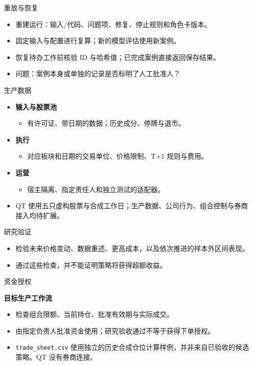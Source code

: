 \begin{frame}{重放与恢复\handsup}
\begin{itemize}
\item 重建运行：输入/代码、问题项、修复、停止规则和角色卡版本。
\item 固定输入与配置进行复算；新的模型评估使用新案例。
\item 恢复待办工作前核验 ID 与哈希值；已完成案例直接返回保存结果。
\item 问题：案例本身或单独的记录是否标明了人工批准人？
\end{itemize}
\end{frame}

\begin{frame}{生产数据}
\begin{itemize}
\item \textbf{输入与股票池}
\begin{itemize}
\item 有许可证、带日期的数据；历史成分、停牌与退市。
\end{itemize}
\item \textbf{执行}
\begin{itemize}
\item 对应板块和日期的交易单位、价格限制、T+1 规则与费用。
\end{itemize}
\item \textbf{运营}
\begin{itemize}
\item 宿主隔离、指定责任人和独立测试的适配器。
\end{itemize}
\item QT 使用五只虚构股票与合成工作日；生产数据、公司行为、组合控制与券商接入均待扩展。
\end{itemize}
\end{frame}

\begin{frame}{研究验证}
\begin{center}
\resizebox{.94\textwidth}{!}{}
\end{center}
\begin{itemize}
\item 检验未来价格变动、数据重述、更高成本，以及依次推进的样本外区间表现。
\item 通过这些检查，并不能证明策略将获得超额收益。
\end{itemize}
\end{frame}

\begin{frame}{资金授权}
\begin{center}
{\small\textbf{目标生产工作流}}\par\smallskip
\resizebox{.94\textwidth}{!}{}
\end{center}
\begin{itemize}
\item 检查组合限额、当前持仓、批准有效期与实际成交。
\item 由指定负责人批准资金使用；研究验收通过不等于获得下单授权。
\item \texttt{trade\_sheet.csv} 使用独立的历史合成仓位计算样例，并非来自已验收的候选策略。QT 没有券商连接。
\end{itemize}
\end{frame}

